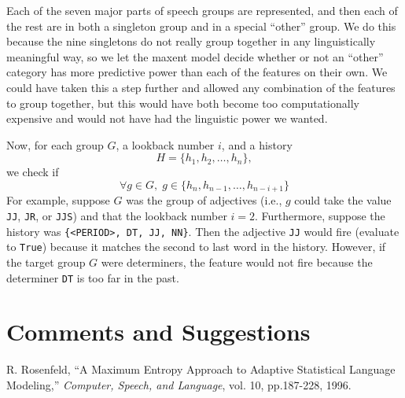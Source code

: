 \documentclass[11pt]{article}
\begin{document}
Each of the seven major parts of speech groups are represented, and then each of the rest are in both a singleton group and in a special ``other'' group. We do this because the nine singletons do not really group together in any linguistically meaningful way, so we let the maxent model decide whether or not an ``other'' category has more predictive power than each of the features on their own. We could have taken this a step further and allowed any combination of the features to group together, but this would have both become too computationally expensive and would not have had the linguistic power we wanted.

Now, for each group $G$, a lookback number $i$, and a history \[ H = \{h_1, h_2, \dots, h_n\},\] we check if
\[ \forall g \in G,\; g \in \{h_{n}, h_{n-1}, \ldots, h_{n-i+1}\}  \]
For example, suppose $G$ was the group of adjectives (i.e., $g$ could take the value \texttt{JJ}, \texttt{JR}, or \texttt{JJS}) and that the lookback number $i = 2$. Furthermore, suppose the history was \texttt{\{<PERIOD>, DT, JJ, NN\}}. Then the adjective \texttt{JJ} would fire (evaluate to \texttt{True}) because it matches the second to last word in the history. However, if the target group $G$ were determiners, the feature would not fire because the determiner \texttt{DT} is too far in the past.

\section{Comments and Suggestions}


\begin{thebibliography}{}

R. Rosenfeld,
``A Maximum Entropy Approach to Adaptive Statistical Language Modeling,''
{\em Computer, Speech, and Language}, vol. 10, pp.187-228, 1996.

\end{thebibliography}
\end{document}
